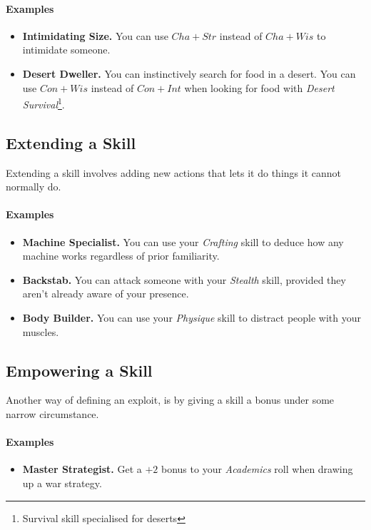 \paragraph{Examples}
\begin{itemize}
    \item \textbf{Intimidating Size.} You can use $Cha+Str$ instead of $Cha+Wis$ to intimidate someone.
    \item \textbf{Desert Dweller.} You can instinctively search for food in a desert. You can use $Con+Wis$ instead of $Con+Int$ when looking for food with \textit{Desert Survival}\footnote{Survival skill specialised for deserts}.
\end{itemize}

\subsection{Extending a Skill}
Extending a skill involves adding new actions that lets it do things it cannot normally do.

\paragraph{Examples}
\begin{itemize}
    \item \textbf{Machine Specialist.} You can use your \textit{Crafting} skill to deduce how any machine works regardless of prior familiarity.
    \item \textbf{Backstab.} You can attack someone with your \textit{Stealth} skill, provided they aren't already aware of your presence.
    \item \textbf{Body Builder.} You can use your \textit{Physique} skill to distract people with your muscles.
\end{itemize}

\subsection{Empowering a Skill}
Another way of defining an exploit, is by giving a skill a bonus under some narrow circumstance.

\paragraph{Examples}
\begin{itemize}
    \item \textbf{Master Strategist.} Get a $+2$ bonus to your \textit{Academics} roll when drawing up a war strategy.
\end{itemize}

